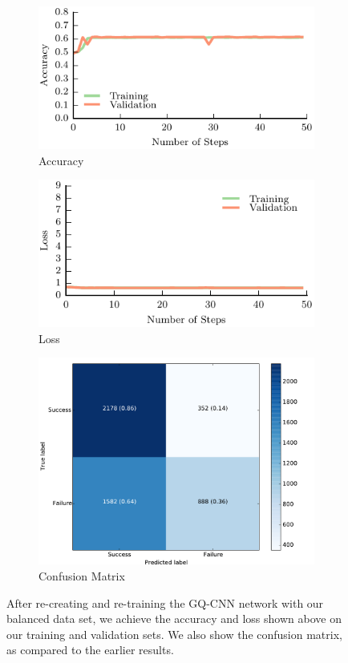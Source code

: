 \begin{figure}[t!]
    \centering
    \begin{subfigure}[t]{0.32\textwidth}
        \includegraphics[width=0.9\columnwidth]{figs/gqcnn_accuracy.pdf}
        \caption{Accuracy} \label{fig:accuracy_gqcnn}
        \end{subfigure}
    \begin{subfigure}[t]{0.32\textwidth}
        \includegraphics[width=0.9\columnwidth]{figs/gqcnn_loss.pdf}
        \caption{Loss} \label{fig:loss_qgcnn}
    \end{subfigure}
		\begin{subfigure}[t]{0.32\textwidth}
        \includegraphics[width=0.8\columnwidth]{figs/trained_gqcnn.pdf}
        \caption{Confusion Matrix} \label{fig:confusion_gqcnn}
    \end{subfigure}
\caption{After re-creating and re-training the GQ-CNN network with our balanced data set, we achieve the accuracy and loss shown above on our training and validation sets. We also show the confusion matrix, as compared to the earlier results.} \label{fig:gqcnn_results}
\end{figure}

